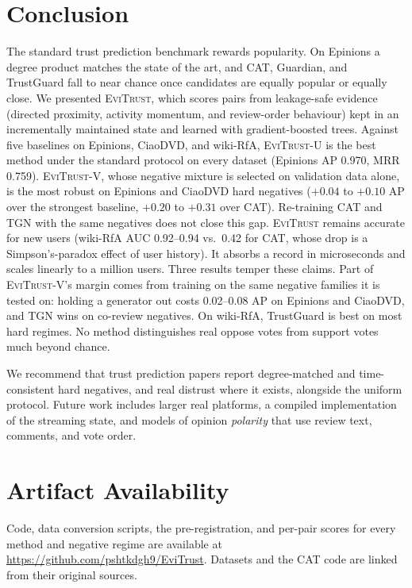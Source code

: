 \documentclass[conference]{IEEEtran}
\newcommand{\evi}{\textsc{EviTrust}}
\newcommand{\eviU}{\textsc{EviTrust}-U}
\newcommand{\eviV}{\textsc{EviTrust}-V}
\begin{document}
\section{Conclusion}

The standard trust prediction benchmark rewards popularity. On Epinions a degree product matches the state of the art, and CAT, Guardian, and TrustGuard fall to near chance once candidates are equally popular or equally close. We presented \evi{}, which scores pairs from leakage-safe evidence (directed proximity, activity momentum, and review-order behaviour) kept in an incrementally maintained state and learned with gradient-boosted trees. Against five baselines on Epinions, CiaoDVD, and wiki-RfA, \eviU{} is the best method under the standard protocol on every dataset (Epinions AP 0.970, MRR 0.759). \eviV{}, whose negative mixture is selected on validation data alone, is the most robust on Epinions and CiaoDVD hard negatives ($+0.04$ to $+0.10$ AP over the strongest baseline, $+0.20$ to $+0.31$ over CAT). Re-training CAT and TGN with the same negatives does not close this gap. \evi{} remains accurate for new users (wiki-RfA AUC 0.92--0.94 vs.\ 0.42 for CAT, whose drop is a Simpson's-paradox effect of user history). It absorbs a record in microseconds and scales linearly to a million users. Three results temper these claims. Part of \eviV{}'s margin comes from training on the same negative families it is tested on: holding a generator out costs 0.02--0.08 AP on Epinions and CiaoDVD, and TGN wins on co-review negatives. On wiki-RfA, TrustGuard is best on most hard regimes. No method distinguishes real oppose votes from support votes much beyond chance.

We recommend that trust prediction papers report degree-matched and time-consistent hard negatives, and real distrust where it exists, alongside the uniform protocol. Future work includes larger real platforms, a compiled implementation of the streaming state, and models of opinion \emph{polarity} that use review text, comments, and vote order.

\section*{Artifact Availability}
Code, data conversion scripts, the pre-registration, and per-pair scores for every method and negative regime are available at \url{https://github.com/pshtkdgh9/EviTrust}. Datasets and the CAT code are linked from their original sources.
\end{document}
